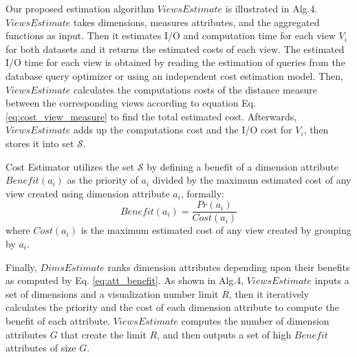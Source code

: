 
Our proposed estimation algorithm $ViewsEstimate$ is illustrated in Alg.4. %
%
$ViewsEstimate$ takes dimensions, measures attributes, and the aggregated functions as input. 
%
Then it estimates I/O and computation time for each view $V_i$ for both datasets and it returns the estimated costs of each view.
%
The estimated I/O time for each view is obtained by reading the estimation of queries from the database query optimizer or using an independent 
cost estimation model. 
%
%
Then, $ViewsEstimate$ calculates the computations costs of the distance measure between the corresponding views according to equation Eq. \ref{eq:cost_view_measure} to find the total estimated cost.
%
Afterwards, $ViewsEstimate$ adds up the computations cost and the I/O cost for $V_i$, then stores it into set $\mathcal{S}$.
%

Cost Estimator utilizes the set $\mathcal{S}$ by defining a benefit of a dimension attribute $Benefit(a_i)$ as the priority of $a_i$ divided by the maximum estimated cost of any view created using dimension attribute $a_i$, formally:
%
\begin{equation}
\label{eq:att_benefit}
Benefit(a_i)=\frac{Pr(a_i)}{Cost(a_i)}
\end{equation}
%
where $Cost(a_i)$ is the maximum estimated cost of any view created by grouping by $a_i$.

%
Finally, $DimsEstimate$ ranks dimension attributes depending upon their benefits as computed by Eq. \ref{eq:att_benefit}.
%
As shown in Alg.4, %
 $ViewsEstimate$ inputs a set of dimensions and a visualization number limit $R$,
then it iteratively calculates the priority and the cost of each dimension attribute to compute the benefit of each attribute. 
%
$ViewsEstimate$ computes the number of dimension attributes $G$ that create the limit $R$, and then outputs a set of high $Benefit$ attributes of size $G$.
%
